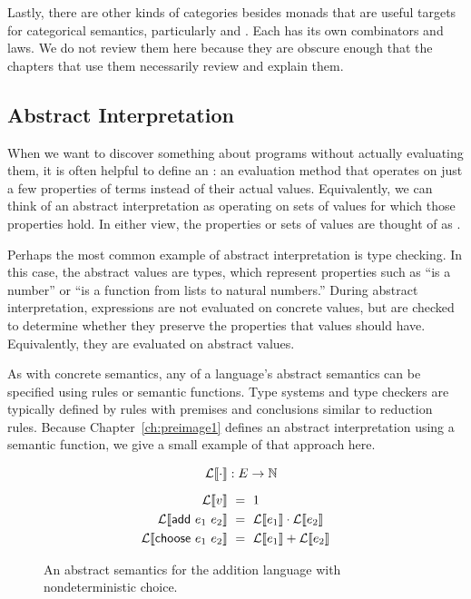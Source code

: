 {Lastly, there are other kinds of categories besides monads that are useful targets for categorical semantics, particularly  and .
Each has its own combinators and laws.
We do not review them here because they are obscure enough that the chapters that use them necessarily review and explain them.


\subsection{Abstract Interpretation}

When we want to discover something about programs without actually evaluating them, it is often helpful to define an : an evaluation method that operates on just a few properties of terms instead of their actual values.
Equivalently, we can think of an abstract interpretation as operating on sets of values for which those properties hold.
In either view, the properties or sets of values are thought of as .

Perhaps the most common example of abstract interpretation is type checking.
In this case, the abstract values are types, which represent properties such as ``is a number'' or ``is a function from lists to natural numbers.''
During abstract interpretation, expressions are not evaluated on concrete values, but are checked to determine whether they preserve the properties that values should have.
Equivalently, they are evaluated on abstract values.

As with concrete semantics, any of a language's abstract semantics can be specified using rules or semantic functions.
Type systems and type checkers are typically defined by rules with premises and conclusions similar to reduction rules.
Because Chapter~\ref{ch:preimage1} defines an abstract interpretation using a semantic function, we give a small example of that approach here.

\newcommand{\Count}[1]{\mathcal{L}\!\meaningof{#1}}

\begin{figure}[tb]\centering
\begin{varwidth}[b]{\textwidth}
\begin{equation*}
\begin{aligned}
	\Count{\cdot} &: E \to \Nat
	\\[6pt]
	\Count{v} &\ =\ 1 \\
	\Count{\mathsf{add}~e_1~e_2} &\ =\ \Count{e_1} \cdot \Count{e_2} \\
	\Count{\mathsf{choose}~e_1~e_2} &\ =\ \Count{e_1} + \Count{e_2}  \\
\end{aligned}
\end{equation*}
\end{varwidth}
\bottomhrule
\caption[Abstract semantics with nondeterminism]{An abstract semantics for the addition language with nondeterministic choice.}
\label{fig:add-choose-abstract}
\end{figure}

}
